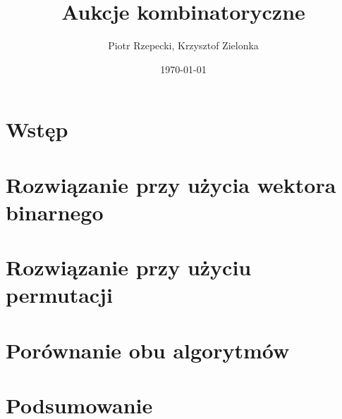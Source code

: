 \documentclass{article}
\title{Aukcje kombinatoryczne}
\author{Piotr Rzepecki, Krzysztof Zielonka}
\date{\today}
\begin{document}
\maketitle

\section{Wstęp}


\section{Rozwiązanie przy użycia wektora binarnego}


\section{Rozwiązanie przy użyciu permutacji}


\section{Porównanie obu algorytmów}


\section{Podsumowanie}

\end{document}
